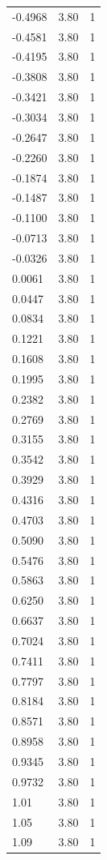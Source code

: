\begin{longtable}{lrr}
  -0.4968 & 3.80 & 1 \\
  -0.4581 & 3.80 & 1 \\
  -0.4195 & 3.80 & 1 \\
  -0.3808 & 3.80 & 1 \\
  -0.3421 & 3.80 & 1 \\
  -0.3034 & 3.80 & 1 \\
  -0.2647 & 3.80 & 1 \\
  -0.2260 & 3.80 & 1 \\
  -0.1874 & 3.80 & 1 \\
  -0.1487 & 3.80 & 1 \\
  -0.1100 & 3.80 & 1 \\
  -0.0713 & 3.80 & 1 \\
  -0.0326 & 3.80 & 1 \\
  0.0061 & 3.80 & 1 \\
  0.0447 & 3.80 & 1 \\
  0.0834 & 3.80 & 1 \\
  0.1221 & 3.80 & 1 \\
  0.1608 & 3.80 & 1 \\
  0.1995 & 3.80 & 1 \\
  0.2382 & 3.80 & 1 \\
  0.2769 & 3.80 & 1 \\
  0.3155 & 3.80 & 1 \\
  0.3542 & 3.80 & 1 \\
  0.3929 & 3.80 & 1 \\
  0.4316 & 3.80 & 1 \\
  0.4703 & 3.80 & 1 \\
  0.5090 & 3.80 & 1 \\
  0.5476 & 3.80 & 1 \\
  0.5863 & 3.80 & 1 \\
  0.6250 & 3.80 & 1 \\
  0.6637 & 3.80 & 1 \\
  0.7024 & 3.80 & 1 \\
  0.7411 & 3.80 & 1 \\
  0.7797 & 3.80 & 1 \\
  0.8184 & 3.80 & 1 \\
  0.8571 & 3.80 & 1 \\
  0.8958 & 3.80 & 1 \\
  0.9345 & 3.80 & 1 \\
  0.9732 & 3.80 & 1 \\
  1.01 & 3.80 & 1 \\
  1.05 & 3.80 & 1 \\
  1.09 & 3.80 & 1 \\

\end{longtable}
